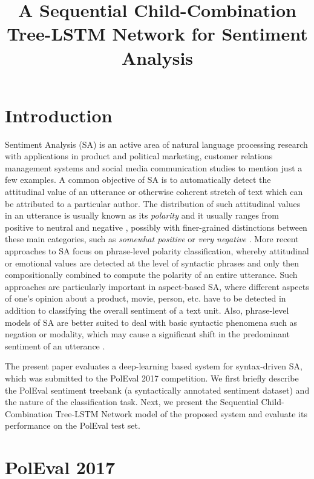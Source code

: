 \documentclass[10pt, a4paper]{article}
\title{A Sequential Child-Combination Tree-LSTM Network for Sentiment Analysis}
\begin{document}
\maketitleabstract

\section{Introduction}   
Sentiment Analysis (SA) is an active area of natural language processing research with applications in product and political marketing, customer relations management systems and social media communication studies to mention just a few examples. A common objective of SA is to automatically detect the attitudinal value of an utterance or otherwise coherent stretch of text which can be attributed to a particular author. The distribution of  such attitudinal values in an utterance is usually known as its \textit{polarity} and it usually ranges from positive to neutral and negative \cite{cambria_schuller}, possibly with finer-grained distinctions between these main categories, such as \textit{somewhat positive} or \textit{very negative} \cite{socher2013recursive}. More recent approaches to SA focus on phrase-level polarity classification, whereby attitudinal or emotional values are detected at the level of syntactic phrases and only then compositionally combined to compute the polarity of an entire utterance. Such approaches are particularly important in aspect-based SA, where different aspects of one's opinion about a product, movie, person, etc. have to be detected in addition to  classifying the overall sentiment of a text unit. Also, phrase-level models of SA are better suited to deal with basic syntactic phenomena such as negation or modality, which may cause a significant shift in the predominant sentiment of an utterance \cite{wilson_wiebe}. 
\par The present paper evaluates a deep-learning based system for syntax-driven SA, which was submitted to the PolEval 2017 competition. We first briefly describe the PolEval sentiment treebank (a syntactically annotated sentiment dataset) and the nature of the classification task. Next, we present the Sequential Child-Combination Tree-LSTM Network model of the proposed system and evaluate its performance on the PolEval test set.


\section{PolEval 2017}
\end{document}
